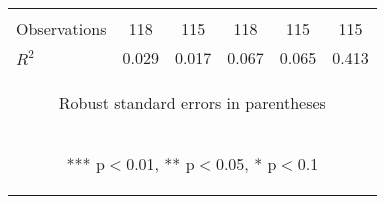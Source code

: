 \begin{center}
\begin{tabular}{lccccc}
\vspace{4pt} & \begin{footnotesize}\end{footnotesize} & \begin{footnotesize}\end{footnotesize} & \begin{footnotesize}\end{footnotesize} & \begin{footnotesize}\end{footnotesize} & \begin{footnotesize}\end{footnotesize} \\
Observations & 118 & 115 & 118 & 115 & 115 \\
 $R^2$ & 0.029 & 0.017 & 0.067 & 0.065 & 0.413 \\ \hline
\multicolumn{6}{c}{\begin{footnotesize} Robust standard errors in parentheses\end{footnotesize}} \\
\multicolumn{6}{c}{\begin{footnotesize} *** p$<$0.01, ** p$<$0.05, * p$<$0.1\end{footnotesize}} \\
\end{tabular}
\end{center}
